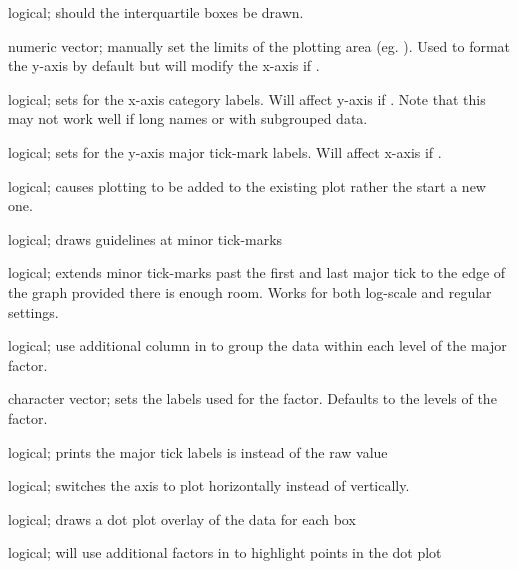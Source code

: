 \documentclass[a4paper]{book}
\begin{document}
\begin{Arguments}
\begin{ldescription}
\item[\code{drawBox}] logical; should the interquartile boxes be drawn.

\item[\code{yLim}] numeric vector; manually set the limits of the plotting area (eg. ). Used to format the y-axis by default but will modify the x-axis if .

\item[\code{rotateLabels}] logical; sets  for the x-axis category labels. Will affect y-axis if . Note that this may not work well if long names or with subgrouped data.

\item[\code{rotateY}] logical; sets  for the y-axis major tick-mark labels. Will affect x-axis if .

\item[\code{add}] logical; causes plotting to be added to the existing plot rather the start a new one.

\item[\code{minorGuides}] logical; draws guidelines at minor tick-marks

\item[\code{extendTicks}] logical; extends minor tick-marks past the first and last major tick to the edge of the graph provided there is enough room. Works for both log-scale and regular settings.

\item[\code{subGroup}] logical; use additional column in  to group the data within each level of the major factor.

\item[\code{subGroupLabels}] character vector; sets the labels used for the  factor. Defaults to the levels of the factor.

\item[\code{expLabels}] logical; prints the major tick labels is  instead of the raw value

\item[\code{sidePlot}] logical; switches the axis to plot horizontally instead of vertically.

\item[\code{drawPoints}] logical; draws a dot plot overlay of the data for each box

\item[\code{pointHighlights}] logical; will use additional factors in  to highlight points in the dot plot


\end{ldescription}
\end{Arguments}
\end{document}
